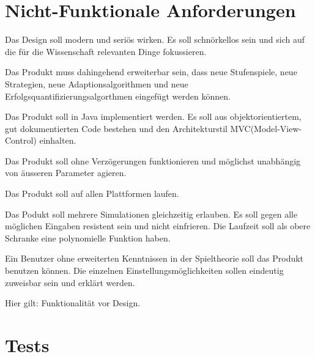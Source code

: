 \documentclass[parskip=full,11pt,twoside]{scrartcl}
\begin{document}
\section{Nicht-Funktionale Anforderungen}


Das Design soll modern und seriös wirken. Es soll schnörkellos sein und sich auf die für die Wissenschaft relevanten Dinge fokussieren.


Das Produkt muss dahingehend erweiterbar sein,
dass neue Stufenspiele, neue Strategien, neue Adaptionsalgorithmen und neue Erfolgsquantifizierungsalgorthmen eingefügt werden können.


Das Produkt soll in Java implementiert werden. Es soll aus objektorientiertem, gut dokumentierten Code bestehen und den Architekturstil MVC(Model-View-Control) einhalten.


Das Produkt soll ohne Verzögerungen funktionieren und möglichst unabhängig von äusseren Parameter agieren.


Das Produkt soll auf allen Plattformen laufen.


Das Podukt soll mehrere Simulationen gleichzeitig erlauben. Es soll gegen alle möglichen Eingaben resistent sein und nicht einfrieren.
Die Laufzeit soll als obere Schranke eine polynomielle Funktion haben.


Ein Benutzer ohne erweiterten Kenntnissen in der Spieltheorie soll das Produkt benutzen können.
Die einzelnen Einstellungsmöglichkeiten sollen eindeutig zuweisbar sein und erklärt werden. 

Hier gilt: Funktionalität vor Design. 

\section{Tests}

\end{document}
